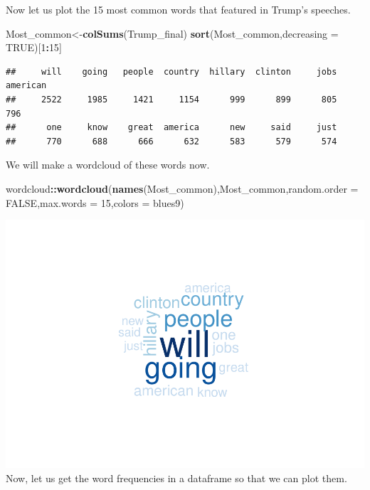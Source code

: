 \documentclass[]{article}
\newenvironment{Shaded}{\begin{snugshade}}{\end{snugshade}}
\newcommand{\KeywordTok}[1]{\textcolor[rgb]{0.13,0.29,0.53}{\textbf{#1}}}
\newcommand{\DataTypeTok}[1]{\textcolor[rgb]{0.13,0.29,0.53}{#1}}
\newcommand{\DecValTok}[1]{\textcolor[rgb]{0.00,0.00,0.81}{#1}}
\newcommand{\OtherTok}[1]{\textcolor[rgb]{0.56,0.35,0.01}{#1}}
\newcommand{\OperatorTok}[1]{\textcolor[rgb]{0.81,0.36,0.00}{\textbf{#1}}}
\newcommand{\NormalTok}[1]{#1}
\begin{document}
Now let us plot the 15 most common words that featured in Trump's
speeches.

\begin{Shaded}
\begin{Highlighting}[]
\NormalTok{Most_common<-}\KeywordTok{colSums}\NormalTok{(Trump_final)}
\KeywordTok{sort}\NormalTok{(Most_common,}\DataTypeTok{decreasing =} \OtherTok{TRUE}\NormalTok{)[}\DecValTok{1}\OperatorTok{:}\DecValTok{15}\NormalTok{]}
\end{Highlighting}
\end{Shaded}

\begin{verbatim}
##     will    going   people  country  hillary  clinton     jobs american 
##     2522     1985     1421     1154      999      899      805      796 
##      one     know    great  america      new     said     just 
##      770      688      666      632      583      579      574
\end{verbatim}

We will make a wordcloud of these words now.

\begin{Shaded}
\begin{Highlighting}[]
\NormalTok{wordcloud}\OperatorTok{::}\KeywordTok{wordcloud}\NormalTok{(}\KeywordTok{names}\NormalTok{(Most_common),Most_common,}\DataTypeTok{random.order =} \OtherTok{FALSE}\NormalTok{,}\DataTypeTok{max.words =} \DecValTok{15}\NormalTok{,}\DataTypeTok{colors =}\NormalTok{ blues9)}
\end{Highlighting}
\end{Shaded}

\includegraphics{Donald_Trump_Speech_sentiment_analysis_files/figure-latex/unnamed-chunk-14-1.pdf}
Now, let us get the word frequencies in a dataframe so that we can plot
them.
\end{document}
